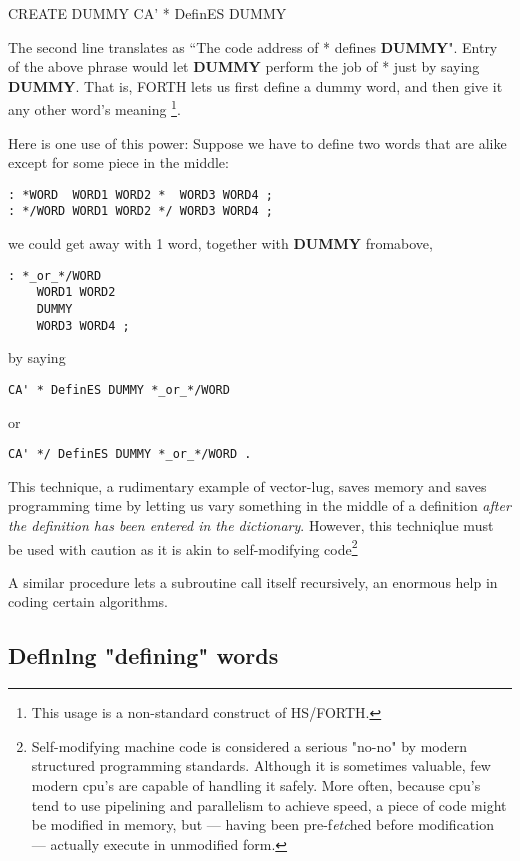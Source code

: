 CREATE DUMMY
CA' * DefinES DUMMY

The second line translates as ``The code address of * defines \textbf{DUMMY}". Entry of the above phrase would let \textbf{DUMMY} perform the job of * just by saying \textbf{DUMMY}. That is, FORTH lets us first define a dummy word, and then give it any other word’s meaning \footnote{This usage is a non-standard construct of HS/FORTH.}.

Here is one use of this power: Suppose we have to define two words that are alike except for some piece in the middle:
\begin{lstlisting}
: *WORD  WORD1 WORD2 *  WORD3 WORD4 ;
: */WORD WORD1 WORD2 */ WORD3 WORD4 ;
\end{lstlisting}

we could get away with 1 word, together with \textbf{DUMMY} fromabove,

\begin{lstlisting}
: *_or_*/WORD
    WORD1 WORD2
    DUMMY
    WORD3 WORD4 ;
\end{lstlisting}
by saying
\begin{lstlisting}
CA' * DefinES DUMMY *_or_*/WORD
\end{lstlisting}

or
\begin{lstlisting}
CA' */ DefinES DUMMY *_or_*/WORD .
\end{lstlisting}

This technique, a rudimentary example of vector-lug, saves memory and saves programming time by letting us vary something in the middle of a definition \textit{after the definition has been entered in the dictionary}. However, this techniqlue must be used with caution as it is akin to self-modifying code\footnote{Self-modifying machine code is considered a serious "no-no" by modern structured programming standards. Although it is sometimes valuable, few modern cpu's are capable of handling it safely. More often, because cpu's tend to use pipelining and parallelism to achieve speed, a piece of code might be modified in memory, but — having been pre-f\textit{etc}hed before modification — actually execute in unmodified form.}


A similar procedure lets a subroutine call itself recursively, an enormous help in coding certain algorithms.

\subsection{Deﬂnlng "defining" words}

